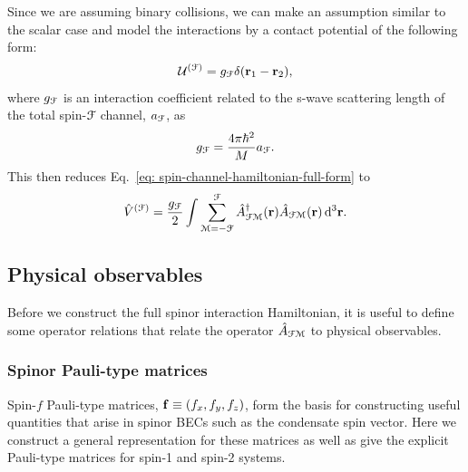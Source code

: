 Since we are assuming binary collisions, we can make an assumption similar to
the scalar case and model the interactions by a contact potential of the
following form:
\begin{align}
    \mathcal{U}^{(\EuScript{F})} = g_\EuScript{F}\delta(\vb{r}_1 - \vb{r}_2),
\end{align}
where \(g_\EuScript{F}\) is an interaction coefficient related to the s-wave
scattering length of the total spin-\(\EuScript{F}\) channel,
\(a_\EuScript{F}\), as
\begin{align}
    g_\EuScript{F} = \frac{4\pi\hbar^2}{M}a_\EuScript{F}.
\end{align}
This then reduces Eq.~\eqref{eq: spin-channel-hamiltonian-full-form} to
\begin{align}\label{eq: spin-channel-hamiltonian}
    \hat{V}^{(\EuScript{F})} = \frac{g_\EuScript{F}}{2}\int
    \sum_{\EuScript{M}=-\EuScript{F}}^{\EuScript{F}}
    \hat{A}^\dagger_{\EuScript{F}\EuScript{M}}(\vb{r})
    \hat{A}_{\EuScript{F}\EuScript{M}}(\vb{r}) \,
    \dd^3\vb{r}.
\end{align}

\subsection{Physical observables}
Before we construct the full spinor interaction Hamiltonian, it is useful to
define some operator relations that relate the operator
\(\hat{A}_{\EuScript{F}\EuScript{M}}\) to physical observables.

\subsubsection{Spinor Pauli-type matrices}
Spin-\(f\) Pauli-type matrices, \(\vb{f}\equiv(f_x, f_y, f_z)\), form the
basis for constructing useful quantities that arise in spinor BECs such as the
condensate spin vector.
Here we construct a general representation for these matrices as well as give
the explicit Pauli-type matrices for spin-1 and spin-2 systems.

